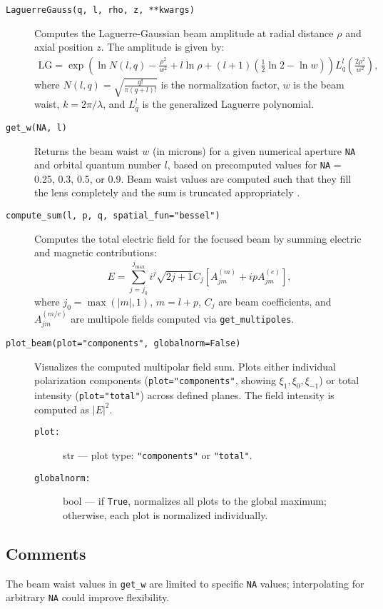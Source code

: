 \begin{description}
    \item[\texttt{LaguerreGauss(q, l, rho, z, **kwargs)}]
    Computes the Laguerre-Gaussian beam amplitude at radial distance \( \rho \) and axial position \( z \). The amplitude is given by:
    \begin{equation}
    \begin{aligned}
        \text{LG} = \exp\left( \ln N(l, q) - \frac{\rho^2}{w^2} + l \ln \rho + (l + 1) \left( \frac{1}{2} \ln 2 - \ln w \right) \right) L_q^l\left( \frac{2 \rho^2}{w^2} \right),
    \end{aligned}
    \end{equation}
    where \( N(l, q) = \sqrt{\frac{q!}{\pi (q + l)!}} \) is the normalization factor, \( w \) is the beam waist, \( k = 2\pi / \lambda \), and \( L_q^l \) is the generalized Laguerre polynomial.

    \item[\texttt{get\_w(NA, l)}]
    Returns the beam waist \( w \) (in microns) for a given numerical aperture \texttt{NA} and orbital quantum number \( l \), based on precomputed values for \texttt{NA} = 0.25, 0.3, 0.5, or 0.9. Beam waist values are computed such that they fill the lens completely and the sum is truncated appropriately \cite{xavi}.

    \item[\texttt{compute\_sum(l, p, q, spatial\_fun="bessel")}]
    Computes the total electric field for the focused beam by summing electric and magnetic contributions:
    \begin{equation}
        E = \sum_{j=j_0}^{j_{\text{max}}} i^j \sqrt{2j + 1} C_j \left[ A_{j m}^{(m)} + i p A_{j m}^{(e)} \right],
    \end{equation}
    where \( j_0 = \max(|m|, 1) \), \( m = l + p \), \( C_j \) are beam coefficients, and \( A_{j m}^{(m/e)} \) are multipole fields computed via \texttt{get\_multipoles}.

    \item[\texttt{plot\_beam(plot="components", globalnorm=False)}]
    Visualizes the computed multipolar field sum. Plots either individual polarization components (\texttt{plot="components"}, showing \( \xi_1, \xi_0, \xi_{-1} \)) or total intensity (\texttt{plot="total"}) across defined planes. The field intensity is computed as \( |E|^2 \).
    \begin{description}
        \item[\texttt{plot:}] str — plot type: \texttt{"components"} or \texttt{"total"}.
        \item[\texttt{globalnorm:}] bool — if \texttt{True}, normalizes all plots to the global maximum; otherwise, each plot is normalized individually.
    \end{description}
\end{description}

\subsection{Comments}
The beam waist values in \texttt{get\_w} are limited to specific \texttt{NA} values; interpolating for arbitrary \texttt{NA} could improve flexibility.